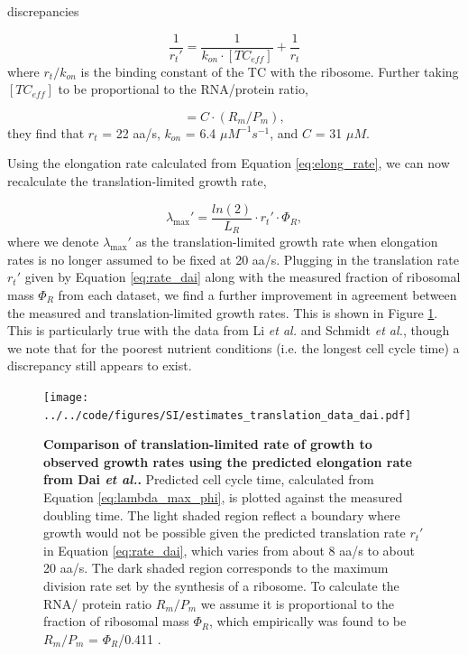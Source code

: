 discrepancies \documentclass[11pt, letterpaper]{article}
\begin{document}
\begin{equation}
\frac{1}{r_t'} = \frac{1}{k_{on} \cdot [TC_{eff}]} + \frac{1}{r_t}
\label{eq:rate_dai}
\end{equation}
where $r_t/k_{on}$ is the binding constant of the TC with the ribosome. Further
taking $[TC_{eff}]$ to be proportional to the RNA/protein ratio,

\begin{equation}
[TC_{eff}] = C \cdot (R_m/P_m),
\label{eq:elong_rate}
\end{equation}
they find that  $r_t$ = 22 aa/s, $k_{on}$ = 6.4 $\mu M^{-1}s^{-1}$, and
$C$ = 31 $\mu M$.


Using the elongation rate calculated from Equation \ref{eq:elong_rate}, we can now
recalculate the translation-limited growth rate,

\begin{equation}
\lambda_{\text{max}}' =  \frac{ln(2)} {L_R} \cdot r_t' \cdot \Phi_R,
\label{eq:lambda_max_phi_dai}
\end{equation}
where we denote $\lambda_{\text{max}}'$ as the translation-limited growth rate when elongation rates is no longer assumed
to be fixed at 20 aa/s. Plugging in the translation rate $r_t'$ given by Equation \ref{eq:rate_dai}
along with the measured fraction of ribosomal mass $\Phi_R$ from each dataset, we find a
further improvement in agreement between the measured and translation-limited growth rates.
This is shown in Figure \ref{fig:estimates_translation_data_dai}. This is particularly true with
the data from Li {\it et al.} and Schmidt {\it et al.}, though we note that
for the poorest nutrient conditions (i.e. the longest cell cycle time) a
discrepancy still appears to exist.

\begin{figure}[H]
		\centering
    \texttt{[image: ../../code/figures/SI/estimates\_translation\_data\_dai.pdf]}
  \caption{{\bf Comparison of translation-limited rate of growth to observed growth rates using the predicted
	elongation rate from Dai {\it et al.}.}
	Predicted cell cycle time, calculated from  Equation \ref{eq:lambda_max_phi}, is plotted
	against the measured doubling time.	The light shaded region reflect a boundary where growth would not be possible
	given the predicted translation rate $r_t'$ in Equation \ref{eq:rate_dai}, which varies from about 8 aa/s to about 20 aa/s.
	The dark shaded region corresponds to the maximum
	division rate set by the synthesis of a ribosome. To calculate the RNA/ protein ratio
	$R_m/P_m$ we assume it is proportional to the fraction of ribosomal mass $\Phi_R$,  which
	empirically was found to be $R_m/P_m$ = $\Phi_R$/0.411 \cite{Dai2016}.}
  \label{fig:estimates_translation_data_dai}
\end{figure}


\end{document}
